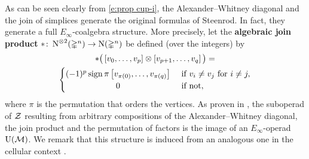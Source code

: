 As can be seen clearly from \cref{e:prop cup-i}, the Alexander--Whitney diagonal and the join of simplices generate the original formulas of Steenrod.
In fact, they generate a full $E_\infty$-coalgebra structure.
More precisely, let the \textbf{algebraic join product} $\ast \colon \operatorname{N}^{\otimes 2}(\mathbb{\Delta}^n) \to \operatorname{N}(\mathbb{\Delta}^n)$ be defined (over the integers) by
\begin{multline}
	\ast \big(\left[v_0, \dots, v_p \right] \ot \left[v_{p+1}, \dots, v_q\right]\big) =\\
	\begin{cases}
		(-1)^p \sign \pi \left[v_{\pi(0)}, \dots, v_{\pi(q)}\right] &
		\text{ if } v_i \neq v_j \text{ for } i \neq j, \\
		\hfil 0 &
		\text{ if not},
	\end{cases}
\end{multline}
where $\pi$ is the permutation that orders the vertices.
As proven in \cite{medina2020prop1}, the suboperad of $\mathcal{Z}$ resulting from arbitrary compositions of the Alexander--Whitney diagonal, the join product and the permutation of factors is the image of an $E_\infty$-operad $\operatorname{U}(\mathcal{M})$.
We remark that this structure is induced from an analogous one in the cellular context \cite{medina2021prop2}.


